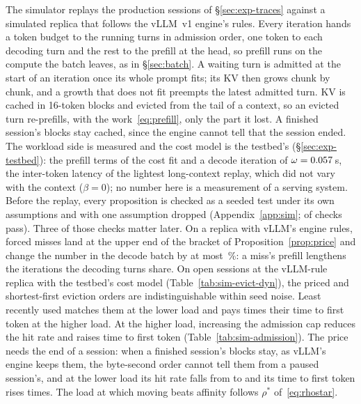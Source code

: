 The simulator replays the production sessions of \S\ref{sec:exp-traces}
against a simulated replica that follows the vLLM~v1 engine's rules.
Every iteration hands a token budget to the running turns in admission
order, one token to each decoding turn and the rest to the prefill at
the head, so prefill runs on the compute the batch leaves, as in
\S\ref{sec:batch}. A waiting turn is admitted at the start of an
iteration once its whole prompt fits; its KV then grows chunk by chunk,
and a growth that does not fit preempts the latest admitted turn. KV is
cached in 16-token blocks and evicted from the tail of a context, so an
evicted turn re-prefills, with the work~\eqref{eq:prefill}, only the
part it lost. A finished session's blocks stay cached, since the engine
cannot tell that the session ended. The workload side is measured and the cost model is the testbed's
(\S\ref{sec:exp-testbed}): the prefill terms of the cost fit and a
decode iteration of $\omega=0.057$\,s, the inter-token latency
of the lightest long-context replay, which did not vary with the
context ($\beta=0$);
no number here is a measurement of a serving system.
Before the replay, every proposition is checked as a seeded test under
its own assumptions and with one assumption dropped
(Appendix~\ref{app:sim}; \simChecksPassed{} of \simChecks{} checks
pass). Three of those checks matter later. On a replica with vLLM's
engine rules, forced misses land at the upper end of the bracket of
Proposition~\ref{prop:price} and change the number in the decode batch
by at most \simDecodeShiftPct\,\%: a miss's prefill lengthens the
iterations the decoding turns share. On open sessions at the vLLM-rule replica with
the testbed's cost model (Table~\ref{tab:sim-evict-dyn}), the priced
and shortest-first eviction orders are indistinguishable within seed noise.
Least recently used matches them at the lower load and pays
\simEvictLruRatioMax{} times their time to first token at the higher load.
At the higher load, increasing the admission cap reduces the hit rate and
raises time to first token (Table~\ref{tab:sim-admission}). The price needs the end of a session:
when a finished session's blocks stay, as vLLM's engine keeps them, the
byte-second order cannot tell them from a paused session's, and at the
lower load its hit rate falls from \simEndKnownHit{} to
\simEndUnknownHit{} and its time to first token rises
\simEndUnknownTtftRatio{} times. The load at which moving beats
affinity follows $\rho^*$ of~\eqref{eq:rhostar}.


